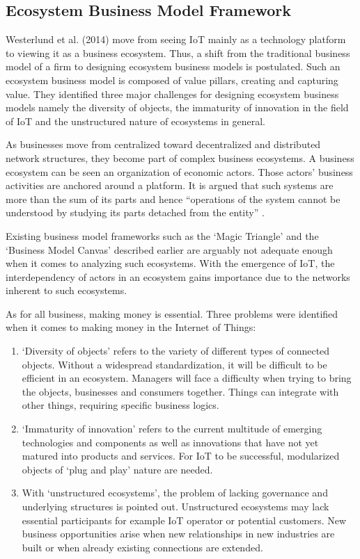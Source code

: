 	\subsection{Ecosystem Business Model Framework}
		Westerlund et al. (2014) \cite{westerlund} move from seeing IoT mainly as a technology platform to viewing it as a business ecosystem. Thus, a shift from the traditional business model of a firm to designing ecosystem business models is postulated. Such an ecosystem business model is composed of value pillars, creating and capturing value. They identified three major challenges for designing ecosystem business models namely the diversity of objects, the immaturity of innovation in the field of IoT and the unstructured nature of ecosystems in general.

		As businesses move from centralized toward decentralized and distributed network structures, they become part of complex business ecosystems. A business ecosystem can be seen an organization of economic actors. Those actors' business activities are anchored around a platform. It is argued that such systems are more than the sum of its parts and hence ``operations of the system cannot be understood by studying its parts detached from the entity'' \cite[p.~6]{westerlund}.

		Existing business model frameworks such as the `Magic Triangle' and the `Business Model Canvas' described earlier are arguably not adequate enough when it comes to analyzing such ecosystems. With the emergence of IoT, the interdependency of actors in an ecosystem gains importance due to the networks inherent to such ecosystems.

		As for all business, making money is essential. Three problems were identified  when it comes to making money in the Internet of Things:

		\begin{enumerate}
			\item `Diversity of objects' refers to the variety of different types of connected objects. Without a widespread standardization, it will be difficult to be efficient in an ecosystem. Managers will face a difficulty when trying to bring the objects, businesses and consumers together. Things can integrate with other things, requiring specific business logics.

			\item `Immaturity of innovation' refers to the current multitude of emerging technologies and components as well as innovations that have not yet matured into products and services. For IoT to be successful, modularized objects of `plug and play' nature are needed.

			\item With `unstructured ecosystems', the problem of lacking governance and underlying structures is pointed out. Unstructured ecosystems may lack essential participants for example IoT operator or potential customers. New business opportunities arise when new relationships in new industries are built or when already existing connections are extended.
		\end{enumerate}

